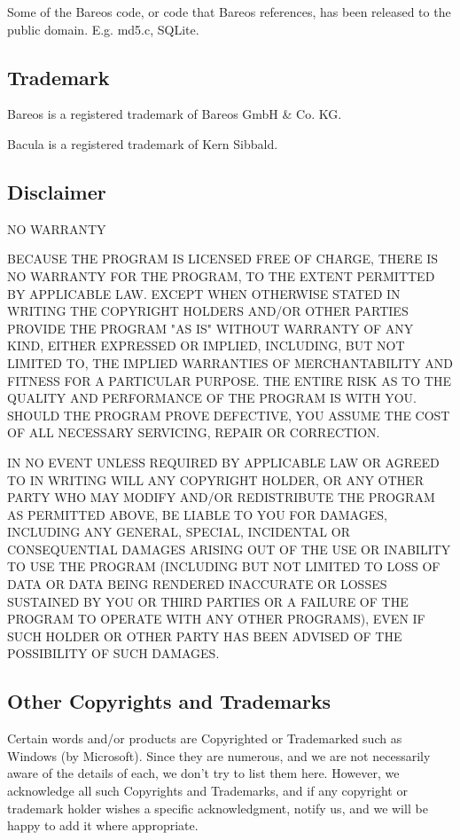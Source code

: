 Some of the Bareos code, or code that Bareos references, has been released
to the public domain. E.g. md5.c, SQLite.

\subsection*{Trademark}

Bareos\raisebox{.6ex}{\textsuperscript{\textregistered}} is a registered
trademark of Bareos GmbH \& Co. KG.

Bacula\raisebox{.6ex}{\textsuperscript{\textregistered}} is a registered
trademark of Kern Sibbald.

\subsection*{Disclaimer}

NO WARRANTY

BECAUSE THE PROGRAM IS LICENSED FREE OF CHARGE, THERE IS NO WARRANTY FOR THE
PROGRAM, TO THE EXTENT PERMITTED BY APPLICABLE LAW. EXCEPT WHEN OTHERWISE
STATED IN WRITING THE COPYRIGHT HOLDERS AND/OR OTHER PARTIES PROVIDE THE
PROGRAM "AS IS" WITHOUT WARRANTY OF ANY KIND, EITHER EXPRESSED OR IMPLIED,
INCLUDING, BUT NOT LIMITED TO, THE IMPLIED WARRANTIES OF MERCHANTABILITY AND
FITNESS FOR A PARTICULAR PURPOSE. THE ENTIRE RISK AS TO THE QUALITY AND
PERFORMANCE OF THE PROGRAM IS WITH YOU. SHOULD THE PROGRAM PROVE DEFECTIVE,
YOU ASSUME THE COST OF ALL NECESSARY SERVICING, REPAIR OR CORRECTION.

IN NO EVENT UNLESS REQUIRED BY APPLICABLE LAW OR AGREED TO IN WRITING WILL ANY
COPYRIGHT HOLDER, OR ANY OTHER PARTY WHO MAY MODIFY AND/OR REDISTRIBUTE THE
PROGRAM AS PERMITTED ABOVE, BE LIABLE TO YOU FOR DAMAGES, INCLUDING ANY
GENERAL, SPECIAL, INCIDENTAL OR CONSEQUENTIAL DAMAGES ARISING OUT OF THE USE
OR INABILITY TO USE THE PROGRAM (INCLUDING BUT NOT LIMITED TO LOSS OF DATA OR
DATA BEING RENDERED INACCURATE OR LOSSES SUSTAINED BY YOU OR THIRD PARTIES OR
A FAILURE OF THE PROGRAM TO OPERATE WITH ANY OTHER PROGRAMS), EVEN IF SUCH
HOLDER OR OTHER PARTY HAS BEEN ADVISED OF THE POSSIBILITY OF SUCH DAMAGES.

\subsection*{Other Copyrights and Trademarks}

Certain words and/or products are Copyrighted or Trademarked such as Windows (by Microsoft). Since
they are numerous, and we are not necessarily aware of the details of each, we don’t try to list them here.
However, we acknowledge all such Copyrights and Trademarks, and if any copyright or trademark holder
wishes a specific acknowledgment, notify us, and we will be happy to add it where appropriate.


